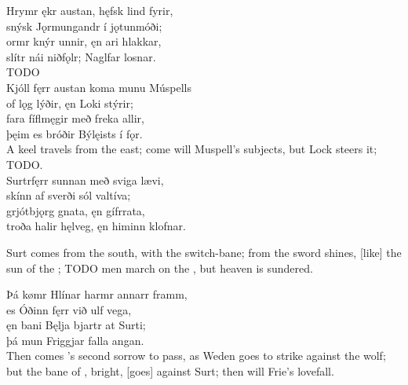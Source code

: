 \bva Hrymr ękr austan, \hld hęfsk lind fyrir, \\%
snýsk Jǫrmungandr \hld í jǫtunmóði; \\%
ormr knýr unnir, \hld ęn ari hlakkar, \\%
slítr nái niðfǫlr; \hld Naglfar losnar.\\%

\bvb TODO\\%

\bva Kjóll fęrr austan \hld koma munu Múspells \\%
of lǫg lýðir, \hld ęn Loki stýrir; \\%
fara fíflmęgir \hld með freka allir, \\%
þęim es bróðir \hld Býlęists í fǫr.\\%

\bvb A keel travels from the east; come will Muspell’s subjects, but Lock steers it; TODO.\\%

\bva Surtr\footnotemark[1] fęrr sunnan \hld með sviga lævi, \\%
skínn af sverði \hld sól valtíva; \\%
grjótbjǫrg gnata, \hld ęn gífr\footnotemark[2] rata, \\%
troða halir hęlveg, \hld ęn himinn klofnar.\\%

\bvb Surt comes from the south, with the switch-bane\footnotemark[1]; from the sword shines, [like] the sun of the ; TODO men march on the , but heaven is sundered.\footnotemark[2]\\%

\bva Þá kømr Hlínar \hld harmr annarr framm, \\%
es Óðinn fęrr \hld við ulf vega, \\%
ęn bani Bęlja \hld bjartr at Surti; \\%
þá mun Friggjar \hld falla angan.\\%

\bvb Then comes ’s second sorrow to pass, as Weden goes to strike against the wolf; but the bane of \footnotemark[1], bright, [goes] against Surt; then will Frie’s love\footnotemark[2] fall.\\%

